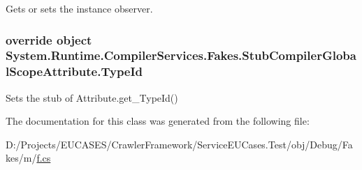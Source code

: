 Gets or sets the instance observer.

\hypertarget{class_system_1_1_runtime_1_1_compiler_services_1_1_fakes_1_1_stub_compiler_global_scope_attribute_af79e528b5c06e646e7e3065a68872a6e}{
\subsubsection[{Type\-Id}]{\setlength{\rightskip}{0pt plus 5cm}override object System.\-Runtime.\-Compiler\-Services.\-Fakes.\-Stub\-Compiler\-Global\-Scope\-Attribute.\-Type\-Id\hspace{0.3cm}{\ttfamily [get]}}}\label{class_system_1_1_runtime_1_1_compiler_services_1_1_fakes_1_1_stub_compiler_global_scope_attribute_af79e528b5c06e646e7e3065a68872a6e}


Sets the stub of Attribute.\-get\-\_\-\-Type\-Id()



The documentation for this class was generated from the following file\-:\begin{DoxyCompactItemize}
\item 
D\-:/\-Projects/\-E\-U\-C\-A\-S\-E\-S/\-Crawler\-Framework/\-Service\-E\-U\-Cases.\-Test/obj/\-Debug/\-Fakes/m/\hyperlink{m_2f_8cs}{f.\-cs}\end{DoxyCompactItemize}
